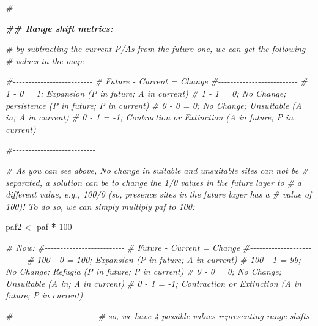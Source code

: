\documentclass[
]{article}
\newenvironment{Shaded}{\begin{snugshade}}{\end{snugshade}}
\newcommand{\CommentTok}[1]{\textcolor[rgb]{0.56,0.35,0.01}{\textit{#1}}}
\newcommand{\DecValTok}[1]{\textcolor[rgb]{0.00,0.00,0.81}{#1}}
\newcommand{\DocumentationTok}[1]{\textcolor[rgb]{0.56,0.35,0.01}{\textbf{\textit{#1}}}}
\newcommand{\NormalTok}[1]{#1}
\newcommand{\OtherTok}[1]{\textcolor[rgb]{0.56,0.35,0.01}{#1}}
\newcommand{\SpecialCharTok}[1]{\textcolor[rgb]{0.81,0.36,0.00}{\textbf{#1}}}
\begin{document}
\begin{Shaded}
\begin{Highlighting}[]
\CommentTok{\#{-}{-}{-}{-}{-}{-}{-}{-}{-}{-}{-}{-}{-}{-}{-}{-}{-}{-}{-}{-}{-}{-}{-}}

\DocumentationTok{\#\# Range shift metrics:}

\CommentTok{\# by subtracting the current P/As from the future one, we can get the following}
\CommentTok{\# values in the map:}

\CommentTok{\#{-}{-}{-}{-}{-}{-}{-}{-}{-}{-}{-}{-}{-}{-}{-}{-}{-}{-}{-}{-}{-}{-}{-}{-}{-}{-}}
\CommentTok{\# Future {-} Current = Change}
\CommentTok{\#{-}{-}{-}{-}{-}{-}{-}{-}{-}{-}{-}{-}{-}{-}{-}{-}{-}{-}{-}{-}{-}{-}{-}{-}{-}{-}}
\CommentTok{\#   1    {-}   0     = 1; Expansion (P in future; A in current)}
\CommentTok{\#   1    {-}   1     = 0; No Change; persistence (P in future; P in current)}
\CommentTok{\#   0    {-}   0     = 0; No Change; Unsuitable (A in; A in current)}
\CommentTok{\#   0    {-}   1     = {-}1; Contraction or Extinction (A in future; P in current)}

\CommentTok{\#{-}{-}{-}{-}{-}{-}{-}{-}{-}{-}{-}{-}{-}{-}{-}{-}{-}{-}{-}{-}{-}{-}{-}{-}{-}{-}{-}}

\CommentTok{\# As you can see above, No change in suitable and unsuitable sites can not be }
\CommentTok{\# separated, a solution can be to change the 1/0 values in the future layer to }
\CommentTok{\# a different value, e.g., 100/0 (so, presence sites in the future layer has a }
\CommentTok{\# value of 100)! To do so, we can simply multiply paf to 100:}

\NormalTok{paf2 }\OtherTok{\textless{}{-}}\NormalTok{ paf }\SpecialCharTok{*} \DecValTok{100} 

\CommentTok{\# Now:}
\CommentTok{\#{-}{-}{-}{-}{-}{-}{-}{-}{-}{-}{-}{-}{-}{-}{-}{-}{-}{-}{-}{-}{-}{-}{-}{-}{-}{-}}
\CommentTok{\# Future {-} Current = Change}
\CommentTok{\#{-}{-}{-}{-}{-}{-}{-}{-}{-}{-}{-}{-}{-}{-}{-}{-}{-}{-}{-}{-}{-}{-}{-}{-}{-}{-}}
\CommentTok{\#   100   {-}   0    = 100; Expansion (P in future; A in current)}
\CommentTok{\#   100   {-}   1    = 99; No Change; Refugia (P in future; P in current)}
\CommentTok{\#   0     {-}   0    = 0; No Change; Unsuitable (A in; A in current)}
\CommentTok{\#   0     {-}   1    = {-}1; Contraction or Extinction (A in future; P in current)}

\CommentTok{\#{-}{-}{-}{-}{-}{-}{-}{-}{-}{-}{-}{-}{-}{-}{-}{-}{-}{-}{-}{-}{-}{-}{-}{-}{-}{-}{-}}
\CommentTok{\# so, we have 4 possible values representing range shifts}


\end{Highlighting}
\end{Shaded}
\end{document}
